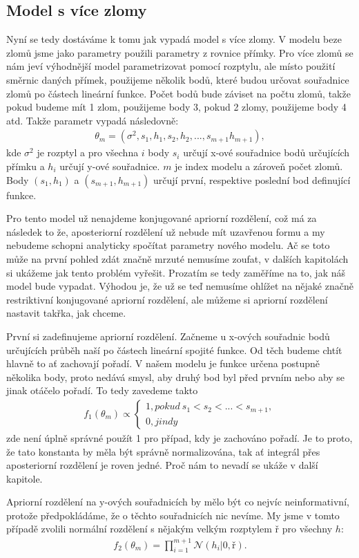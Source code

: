 \documentclass[czech,master,public,dept470,male,cpdeclaration,oneside, python]{diploma}
\begin{document}
\subsection{Model s více zlomy}
Nyní se tedy dostáváme k tomu jak vypadá model s více zlomy. V modelu beze zlomů jsme jako parametry použili parametry z rovnice přímky. Pro více zlomů se nám jeví výhodnější model parametrizovat pomocí rozptylu, ale místo použití směrnic daných přímek, použijeme několik bodů, které budou určovat souřadnice zlomů po částech lineární funkce.  Počet bodů bude záviset na počtu zlomů, takže pokud budeme mít 1 zlom, použijeme body 3, pokud 2 zlomy, použijeme body 4 atd. Takže parametr vypadá následovně:
\begin{align}
\theta_m = (\sigma^2, s_1, h_1, s_2, h_2, ..., s_{m+1} h_{m+1}),
\end{align}
kde $\sigma^2$ je rozptyl a pro všechna $i$ body $s_i$ určují x-ové souřadnice bodů určujících přímku a $h_i$ určují y-ové souřadnice. $m$ je index modelu a zároveň počet zlomů. Body $(s_1, h_1)$ a $(s_{m+1}, h_{m+1})$ určují první, respektive poslední bod definující funkce.\par
Pro tento model už nenajdeme konjugované apriorní rozdělení, což má za následek to že, aposteriorní rozdělení už nebude mít uzavřenou formu a my nebudeme schopni analyticky spočítat parametry nového modelu. Ač se toto může na první pohled zdát značně mrzuté nemusíme zoufat, v dalších kapitolách si ukážeme jak tento problém vyřešit. Prozatím se tedy zaměříme na to, jak náš model bude vypadat. Výhodou je, že už se teď nemusíme ohlížet na nějaké značně restriktivní konjugované apriorní rozdělení, ale můžeme si apriorní rozdělení nastavit takřka, jak chceme.\par
První si zadefinujeme apriorní rozdělení. Začneme u x-ových souřadnic bodů určujících průběh naší po částech lineární spojité funkce. Od těch budeme chtít hlavně to ať zachovají pořadí. V našem modelu je funkce určena postupně několika body, proto nedává smysl, aby druhý bod byl před prvním nebo aby se jinak otáčelo pořadí. To tedy zavedeme takto
\begin{align}
f_1(\theta_m) \propto
	\begin{cases}
		1, pokud\ s_1 < s_2 < ... < s_{m+1}, \\
		0, jindy		
	\end{cases}
\end{align}
zde není úplně správné použít 1 pro případ, kdy je zachováno pořadí. Je to proto, že tato konstanta by měla být správně normalizována, tak ať integrál přes aposteriorní rozdělení je roven jedné. Proč nám to nevadí se ukáže v další kapitole. \par
Apriorní rozdělení na y-ových souřadnicích by mělo být co nejvíc neinformativní, protože předpokládáme, že o těchto souřadnicích nic nevíme. My jsme v tomto případě zvolili normální rozdělení s nějakým velkým rozptylem $ř$ pro všechny $h$:
\begin{align}
f_2(\theta_m) = \prod_{i=1}^{m+1} \mathcal{N}(h_i | 0, ř).
\end{align}
\end{document}
